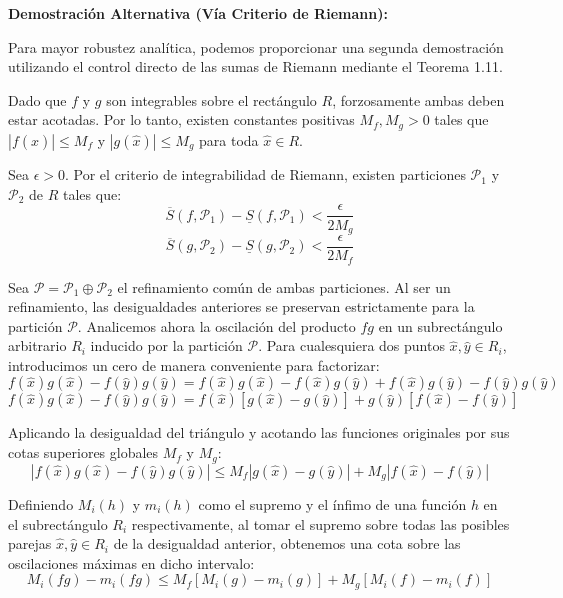 \documentclass[11pt,letterpaper]{article}
\begin{document}
\textbf{Demostración Alternativa (Vía Criterio de Riemann):}

Para mayor robustez analítica, podemos proporcionar una segunda demostración utilizando el control directo de las sumas de Riemann mediante el Teorema 1.11.

Dado que $f$ y $g$ son integrables sobre el rectángulo $R$, forzosamente ambas deben estar acotadas. Por lo tanto, existen constantes positivas $M_f, M_g > 0$ tales que $|f(\hat{x})| \le M_f$ y $|g(\hat{x})| \le M_g$ para toda $\hat{x} \in R$. 

Sea $\epsilon > 0$. Por el criterio de integrabilidad de Riemann, existen particiones $\mathcal{P}_1$ y $\mathcal{P}_2$ de $R$ tales que:
\begin{equation*}
\overline{S}(f, \mathcal{P}_1) - \underline{S}(f, \mathcal{P}_1) < \frac{\epsilon}{2M_g} 
\end{equation*}
\begin{equation*}
\overline{S}(g, \mathcal{P}_2) - \underline{S}(g, \mathcal{P}_2) < \frac{\epsilon}{2M_f}
\end{equation*}

Sea $\mathcal{P} = \mathcal{P}_1 \oplus \mathcal{P}_2$ el refinamiento común de ambas particiones. Al ser un refinamiento, las desigualdades anteriores se preservan estrictamente para la partición $\mathcal{P}$. Analicemos ahora la oscilación del producto $fg$ en un subrectángulo arbitrario $R_i$ inducido por la partición $\mathcal{P}$. Para cualesquiera dos puntos $\hat{x}, \hat{y} \in R_i$, introducimos un cero de manera conveniente para factorizar:
\begin{equation*}
f(\hat{x})g(\hat{x}) - f(\hat{y})g(\hat{y}) = f(\hat{x})g(\hat{x}) - f(\hat{x})g(\hat{y}) + f(\hat{x})g(\hat{y}) - f(\hat{y})g(\hat{y})
\end{equation*}
\begin{equation*}
f(\hat{x})g(\hat{x}) - f(\hat{y})g(\hat{y}) = f(\hat{x})[g(\hat{x}) - g(\hat{y})] + g(\hat{y})[f(\hat{x}) - f(\hat{y})]
\end{equation*}

Aplicando la desigualdad del triángulo y acotando las funciones originales por sus cotas superiores globales $M_f$ y $M_g$:
\begin{equation*}
|f(\hat{x})g(\hat{x}) - f(\hat{y})g(\hat{y})| \le M_f |g(\hat{x}) - g(\hat{y})| + M_g |f(\hat{x}) - f(\hat{y})|
\end{equation*}

Definiendo $M_i(h)$ y $m_i(h)$ como el supremo y el ínfimo de una función $h$ en el subrectángulo $R_i$ respectivamente, al tomar el supremo sobre todas las posibles parejas $\hat{x}, \hat{y} \in R_i$ de la desigualdad anterior, obtenemos una cota sobre las oscilaciones máximas en dicho intervalo:
\begin{equation*}
M_i(fg) - m_i(fg) \le M_f [M_i(g) - m_i(g)] + M_g [M_i(f) - m_i(f)]
\end{equation*}
\end{document}
